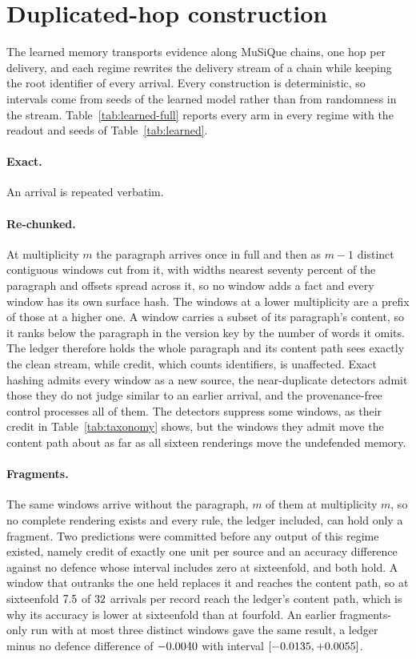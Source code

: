 \documentclass{article}
\begin{document}
\section{Duplicated-hop construction}
\label{app:duplication}

The learned memory transports evidence along MuSiQue chains, one hop per
delivery, and each regime rewrites the delivery stream of a chain while keeping
the root identifier of every arrival. Every construction is deterministic, so
intervals come from seeds of the learned model rather than from randomness in
the stream. Table~\ref{tab:learned-full} reports every arm in every regime with
the readout and seeds of Table~\ref{tab:learned}.

\paragraph{Exact.} An arrival is repeated verbatim.

\paragraph{Re-chunked.} At multiplicity $m$ the paragraph arrives once in full
and then as $m-1$ distinct contiguous windows cut from it, with widths nearest
seventy percent of the paragraph and offsets spread across it, so no window adds
a fact and every window has its own surface hash. The windows at a lower
multiplicity are a prefix of those at a higher one. A window carries a subset of
its paragraph's content, so it ranks below the paragraph in the version key by
the number of words it omits. The ledger therefore holds the whole paragraph and
its content path sees exactly the clean stream, while credit, which counts
identifiers, is unaffected. Exact hashing admits every window as a new source,
the near-duplicate detectors admit those they do not judge similar to an earlier
arrival, and the provenance-free control processes all of them. The detectors
suppress some windows, as their credit in Table~\ref{tab:taxonomy} shows, but
the windows they admit move the content path about as far as all sixteen
renderings move the undefended memory.

\paragraph{Fragments.} The same windows arrive without the paragraph, $m$ of
them at multiplicity $m$, so no complete rendering exists and every rule, the
ledger included, can hold only a fragment. Two predictions were committed before
any output of this regime existed, namely credit of exactly one unit per source
and an accuracy difference against no defence whose interval includes zero at
sixteenfold, and both hold. A window that outranks the one held replaces it and
reaches the content path, so at sixteenfold $7.5$ of
$32$ arrivals per record reach the ledger's content path, which is
why its accuracy is lower at sixteenfold than at fourfold. An earlier
fragments-only run with at most three distinct windows gave the same result, a
ledger minus no defence difference of $-0.0040$ with interval
$[-0.0135, +0.0055]$.
\end{document}
